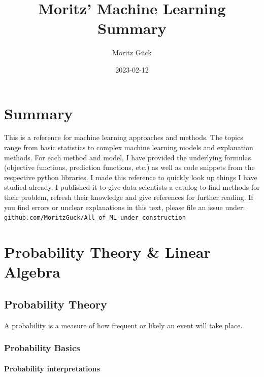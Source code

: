 \documentclass[
]{book}
\title{Moritz' Machine Learning Summary}
\author{Moritz Gück}
\date{2023-02-12}
\begin{document}
\maketitle

{
\setcounter{tocdepth}{1}
\tableofcontents
}
\hypertarget{summary}{%
\chapter*{Summary}\label{summary}}

This is a reference for machine learning approaches and methods. The
topics range from basic statistics to complex machine learning models
and explanation methods. For each method and model, I have provided the
underlying formulas (objective functions, prediction functions, etc.) as
well as code snippets from the respective python libraries. I made this
reference to quickly look up things I have studied already. I published
it to give data scientists a catalog to find methods for their problem,
refresh their knowledge and give references for further reading. If you
find errors or unclear explanations in this text, please file an issue
under: \texttt{github.com/MoritzGuck/All\_of\_ML-under\_construction}

\hypertarget{probability-theory-linear-algebra}{%
\chapter{Probability Theory \& Linear Algebra}\label{probability-theory-linear-algebra}}

\hypertarget{probability-theory}{%
\section{Probability Theory}\label{probability-theory}}

A probability is a measure of how frequent or likely an event will take
place.

\hypertarget{probability-basics}{%
\subsection{Probability Basics}\label{probability-basics}}

\hypertarget{probability-interpretations}{%
\subsubsection{Probability interpretations}\label{probability-interpretations}}
\end{document}
